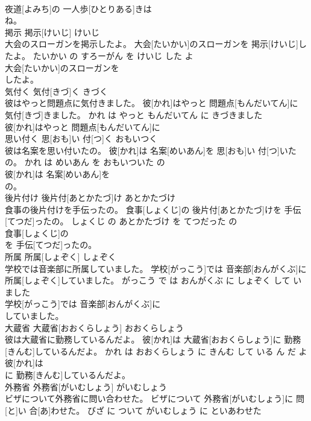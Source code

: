 \documentclass[8pt]{extreport}
\begin{document}
\begin{CJK}{UTF8}{min}
\\	夜道[よみち]の 一人歩[ひとりある]きは
\\	ね。			
\\	掲示	掲示[けいじ]	けいじ	
\\	大会のスローガンを掲示したよ。	大会[たいかい]のスローガンを 掲示[けいじ]したよ。	たいかい の すろーがん を けいじ した よ	
\\	大会[たいかい]のスローガンを
\\	したよ。			
\\	気付く	気付[きづ]く	きづく	
\\	彼はやっと問題点に気付きました。	彼[かれ]はやっと 問題点[もんだいてん]に 気付[きづ]きました。	かれ は やっと もんだいてん に きづきました	
\\	彼[かれ]はやっと 問題点[もんだいてん]に
\\	思い付く	思[おも]い 付[つ]く	おもいつく	
\\	彼は名案を思い付いたの。	彼[かれ]は 名案[めいあん]を 思[おも]い 付[つ]いたの。	かれ は めいあん を おもいついた の	
\\	彼[かれ]は 名案[めいあん]を
\\	の。			
\\	後片付け	後片付[あとかたづ]け	あとかたづけ	
\\	食事の後片付けを手伝ったの。	食事[しょくじ]の 後片付[あとかたづ]けを 手伝[てつだ]ったの。	しょくじ の あとかたづけ を てつだった の	
\\	食事[しょくじ]の
\\	を 手伝[てつだ]ったの。			
\\	所属	所属[しょぞく]	しょぞく	
\\	学校では音楽部に所属していました。	学校[がっこう]では 音楽部[おんがくぶ]に 所属[しょぞく]していました。	がっこう で は おんがくぶ に しょぞく して いました	
\\	学校[がっこう]では 音楽部[おんがくぶ]に
\\	していました。			
\\	大蔵省	大蔵省[おおくらしょう]	おおくらしょう	
\\	彼は大蔵省に勤務しているんだよ。	彼[かれ]は 大蔵省[おおくらしょう]に 勤務[きんむ]しているんだよ。	かれ は おおくらしょう に きんむ して いる ん だ よ	
\\	彼[かれ]は
\\	に 勤務[きんむ]しているんだよ。			
\\	外務省	外務省[がいむしょう]	がいむしょう	
\\	ビザについて外務省に問い合わせた。	ビザについて 外務省[がいむしょう]に 問[と]い 合[あ]わせた。	びざ に ついて がいむしょう に といあわせた	

\end{CJK}
\end{document}
